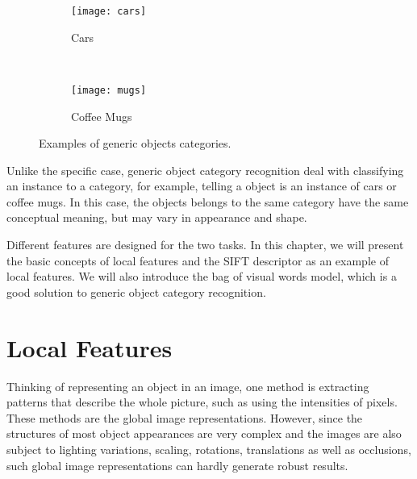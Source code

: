\documentclass[12pt,final,twoside]{report}
\begin{document}
\begin{figure}[tbhp]
  \centering
  \begin{subfigure}[b]{.45\textwidth}
    \texttt{[image: cars]} %
    \caption{Cars\footnotemark}
  \end{subfigure}
  ~
  \begin{subfigure}[b]{.45\textwidth}
    \centering
    \texttt{[image: mugs]}
    \caption{Coffee Mugs}
  \end{subfigure}
  \caption{Examples of generic objects categories.}
  \label{fig:generic}
\end{figure}

Unlike the specific case, generic object category recognition deal with classifying an instance to a category, for example, telling a object is an instance of cars or coffee mugs. In this case, the objects belongs to the same category have the same conceptual meaning, but may vary in appearance and shape.

Different features are designed for the two tasks. In this chapter, we will present the basic concepts of local features and the SIFT descriptor as an example of local features. We will also introduce the bag of visual words model, which is a good solution to generic object category recognition.
\fi



\section{Local Features}
Thinking of representing an object in an image, one method is extracting patterns that describe the whole picture, such as using the intensities of pixels. These methods are the global image representations. However, since the structures of most object appearances are very complex and the images are also subject to lighting variations, scaling, rotations, translations as well as occlusions, such global image representations can hardly generate robust results. 
\end{document}
